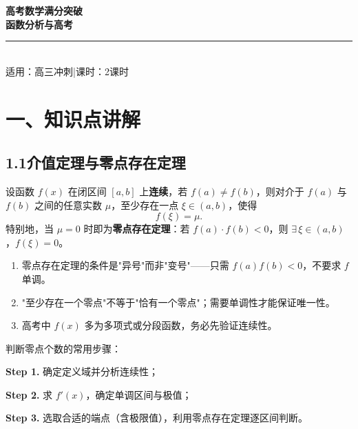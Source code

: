 \documentclass[12pt, a4paper]{ctexart}
\begin{document}
\begin{center}
{\Huge\bfseries\textcolor{mainblue}{高考数学满分突破}}\\[6pt]
{\LARGE\bfseries\textcolor{mainblue}{函数分析与高考}}\\[12pt]
\rule{0.6\textwidth}{1pt}\\[8pt]
{\normalsize 适用：高三冲刺\quad |\quad 课时：2课时}
\end{center}
\vspace{10pt}

\section*{\textcolor{mainblue}{一、知识点讲解}}

\subsection*{1.1\quad 介值定理与零点存在定理}

\begin{knowledgebox}
设函数 $f(x)$ 在闭区间 $[a,b]$ 上\textbf{连续}，若 $f(a)\neq f(b)$，则对介于 $f(a)$ 与 $f(b)$ 之间的任意实数 $\mu$，至少存在一点 $\xi\in(a,b)$，使得
\[
f(\xi)=\mu.
\]
特别地，当 $\mu=0$ 时即为\textbf{零点存在定理}：若 $f(a)\cdot f(b)<0$，则 $\exists\,\xi\in(a,b)$，$f(\xi)=0$。
\end{knowledgebox}

\begin{warnbox}[高考易错点]
\begin{enumerate}[leftmargin=1.5em]
  \item 零点存在定理的条件是"异号"而非"变号"——只需 $f(a)f(b)<0$，不要求 $f$ 单调。
  \item "至少存在一个零点"不等于"恰有一个零点"；需要单调性才能保证唯一性。
  \item 高考中 $f(x)$ 多为多项式或分段函数，务必先验证连续性。
\end{enumerate}
\end{warnbox}

\begin{tipbox}[使用策略]
判断零点个数的常用步骤：\par
\textbf{Step 1.} 确定定义域并分析连续性；\par
\textbf{Step 2.} 求 $f'(x)$，确定单调区间与极值；\par
\textbf{Step 3.} 选取合适的端点（含极限值），利用零点存在定理逐区间判断。
\end{tipbox}
\end{document}
